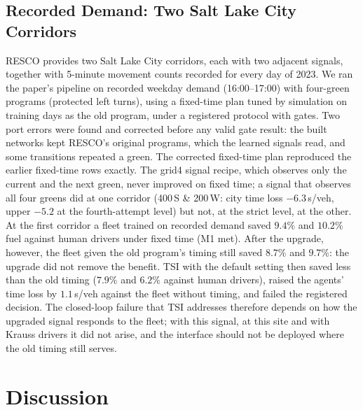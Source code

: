 \subsection{Recorded Demand: Two Salt Lake City Corridors}\label{sec:f1}
RESCO \cite{ault2021} provides two Salt Lake City corridors, each with two adjacent signals, together with 5-minute movement counts recorded
for every day of 2023. We ran the paper's pipeline on recorded weekday demand (16:00--17:00) with four-green programs (protected left turns),
using a fixed-time plan tuned by simulation on training days as the old program, under a registered protocol with gates. Two port errors were
found and corrected before any valid gate result: the built networks kept RESCO's original programs, which the learned signals read, and some
transitions repeated a green. The corrected fixed-time plan reproduced the earlier fixed-time rows exactly. The grid4 signal recipe, which
observes only the current and the next green, never improved on fixed time; a signal that observes all four greens did at one corridor
(400\,S \& 200\,W: city time loss $-6.3$\,s/veh, upper $-5.2$ at the fourth-attempt level) but not, at the strict level, at the other. At the
first corridor a fleet trained on recorded demand saved $9.4\%$ and $10.2\%$ fuel against human drivers under fixed time (M1 met). After the
upgrade, however, the fleet given the old program's timing still saved $8.7\%$ and $9.7\%$: the upgrade did not remove the benefit. TSI with
the default setting then saved less than the old timing ($7.9\%$ and $6.2\%$ against human drivers), raised the agents' time loss by
$1.1$\,s/veh against the fleet without timing, and failed the registered decision. The closed-loop failure that TSI addresses therefore
depends on how the upgraded signal responds to the fleet; with this signal, at this site and with Krauss drivers it did not arise, and the
interface should not be deployed where the old timing still serves.

\section{Discussion}\label{sec:discussion}
